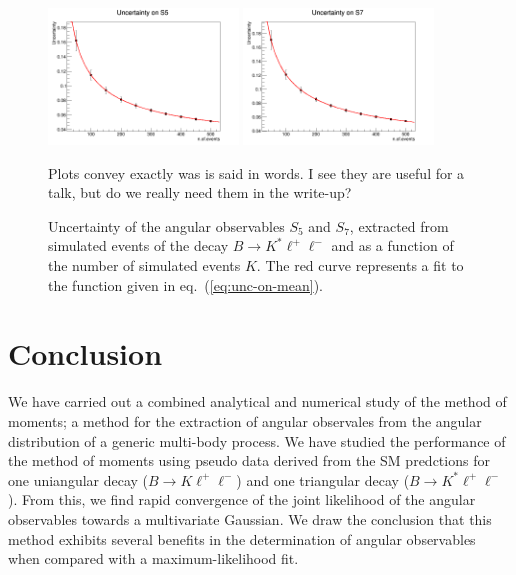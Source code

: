 \documentclass[aps,prd,reprint,nofootinbib,preprintnumbers]{revtex4}
\newcommand{\refeq}[1]{eq.~(\ref{eq:#1})}
\newcommand{\fred}[1]{{\color{brown!85!black}#1}}
\begin{document}
\begin{figure}[t]
        \centering
            \includegraphics[width=0.45\textwidth]{figs/error-Q2_5_6_S5.png}
            \includegraphics[width=0.45\textwidth]{figs/error-Q2_5_6_S7.png}
            \caption{Uncertainty of the angular observables $S_5$ and $S_7$, extracted from simulated events of the decay $B\to K^*\ell^+\ell^-$ and as a function of the number of simulated events $K$. The red curve represents a fit to the function given in \refeq{unc-on-mean}.}
            \label{fig:errors}
            \fred{Plots convey exactly was is said in words. I see they are useful for a talk, but do we really need them in the write-up?}
\end{figure}

\section{Conclusion}

We have carried out a combined analytical and numerical study of the method of moments; a method for
the extraction of angular observales from the angular distribution of a generic multi-body process.
We have studied the performance of the method of moments using pseudo data derived from the SM
predctions for one uniangular decay ($B\to K\ell^+\ell^-$) and one triangular decay ($B\to K^*\ell^+\ell^-$).
From this, we find rapid convergence of the joint likelihood of the angular observables towards a multivariate Gaussian.
We draw the conclusion that this method exhibits several benefits in the determination of angular observables when
compared with a maximum-likelihood fit.\\
\end{document}
